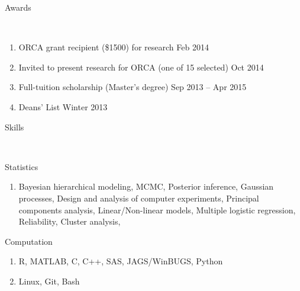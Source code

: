 \documentclass[12pt]{article}
\newcommand{\head}[1]{ %
    \bigskip %
    \bigskip %
    \begin{Large}\begin{bf}{#1}\end{bf}\end{Large} %

    \ \\ [-1.3cm] %

    \hrulefill}
\newcommand{\subhead}[1]{\begin{sc}{#1}\end{sc}}
\begin{document}
\head{Awards}

\begin{enumerate}[label=$\cdot$]%
\item ORCA grant recipient (\$1500) for research \hfill Feb 2014
\item Invited to present research for ORCA (one of 15 selected) \hfill Oct 2014
\item Full-tuition scholarship (Master's degree) \hfill Sep 2013 -- Apr 2015
\item Deans' List \hfill Winter 2013
\end{enumerate}

\head{Skills}

\subhead{Statistics}

\begin{enumerate}[label=$$, rightmargin=1.5cm]
\item Bayesian hierarchical modeling, MCMC, Posterior inference, Gaussian processes, Design and analysis of computer experiments, Principal components analysis, Linear/Non-linear models, Multiple logistic regression, Reliability, Cluster analysis,
\end{enumerate}

\subhead{Computation}

\begin{enumerate}[label=$\cdot$, rightmargin=1.5cm]
\item R, MATLAB, C, C++, SAS, JAGS/WinBUGS, Python
\item Linux, Git, Bash
\end{enumerate}
\end{document}
